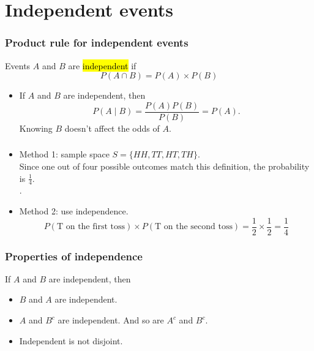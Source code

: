 \documentclass[slidestop,compress,mathserif]{beamer}
\begin{document}
\section{Independent events}
\begin{frame}
\frametitle{Product rule for independent events}

\begin{defn}
Events $A$ and $B$ are \hl{independent} if
\[P(A \cap B) = P(A) \times P(B) \]
\end{defn}

\pause
\begin{itemize}
\item If $A$ and $B$ are independent, then
\[P(A \mid B) = \frac{P(A)P(B)}{P(B)} = P(A).\]
Knowing $B$ doesn't affect the odds of $A$.
\end{itemize}

\end{frame}
\begin{frame}\frametitle{}
\pause
\begin{itemize}
\item Method 1: sample space $S = \{ HH, TT, HT, TH \}$.\\
Since one out of four possible outcomes match this definition,
the probability is $\frac{1}{4}$.\\
.
\pause
\item Method 2: use independence.
\[ P(\text{T on the first toss}) \times  P(\text{T on the second toss}) = \frac{1}{2} \times \frac{1}{2} = \frac{1}{4} \]
\vspace{-0.5cm}
\end{itemize}

\end{frame}

\begin{frame}\frametitle{Properties of independence}
If $A$ and $B$ are independent, then
\begin{itemize}
\item $B$ and $A$ are independent.
\vspace{1.5cm}

\pause
\item $A$ and $B^c$ are independent. And so are $A^c$ and $B^c$.
\vspace{1.5cm}


\pause
\item Independent is not disjoint.

\vspace{1.5cm}



\end{itemize}

\end{frame}
\end{document}

